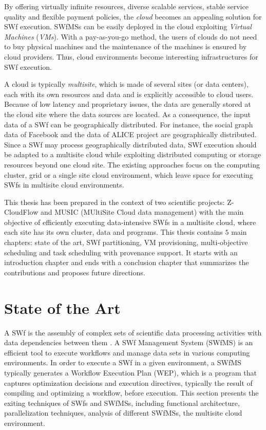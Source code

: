 By offering virtually infinite resources, diverse scalable services, stable service quality and flexible payment policies, 
the \textit{cloud} becomes an appealing solution for SWf execution. 
SWfMSs can be easily deployed in the cloud exploiting \textit{Virtual Machines} (\textit{VMs}). 
With a pay-as-you-go method, the users of clouds do not need to buy physical machines and the maintenance of the machines is ensured by cloud providers. 
Thus, cloud environments become interesting infrastructures for SWf execution.

A cloud is typically \textit{multisite}, which is made of several sites (or data centers), each with its own resources and data and is explicitly accessible to cloud users.
Because of low latency and proprietary issues, the data are generally stored at the cloud site where the data sources are located. 
As a consequence, the input data of a SWf can be geographically distributed. 
For instance, the social graph data of Facebook \cite{Bronson2013} and the data of ALICE project \cite{alice} are geographically distributed.
Since a SWf may process geographically distributed data, SWf execution should be adapted to a multisite cloud while exploiting distributed computing or storage resources beyond one cloud site. 
The existing approaches focus on the computing cluster, grid or a single site cloud environment, which leave space for executing SWfs in multisite cloud environments. 

This thesis has been prepared in the context of two scientific projects: Z-CloudFlow and
MUSIC (MUltiSite Cloud data management) with the main objective of efficiently executing data-intensive SWfs in a multisite
cloud, where each site has its own cluster, data and programs. This thesis contains $5$ main chapters: state of the art, SWf partitioning, VM provisioning, multi-objective scheduling and task scheduling with provenance support. It starts with an introduction chapter and ends with a conclusion chapter that summarizes the contributions and proposes future directions.

\section*{State of the Art} 

A SWf is the assembly of complex sets of scientific data processing activities with data
dependencies between them \cite{Deelman2009}. 
A SWf Management System (SWfMS) is an efficient tool to execute workflows and
manage data sets in various computing environments.
In order to execute a SWf in a given environment, a SWfMS typically generates a Workflow
Execution Plan (WEP), which is a program that captures optimization decisions and
execution directives, typically the result of compiling and optimizing a workflow, before
execution.
This section presents the exiting techniques of SWfs and SWfMSs, including functional architecture, parallelization techniques, analysis of different SWfMSs, the multisite cloud environment.


